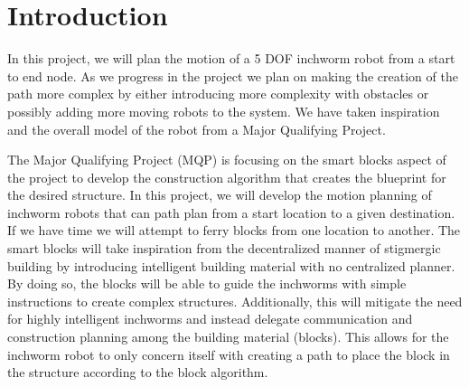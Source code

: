\section{Introduction}

In this project, we will plan the motion of a 5 DOF inchworm robot from a start to end node. As we progress in the project we plan on making the creation of the path more complex by either introducing more complexity with obstacles or possibly adding more moving robots to the system. We have taken inspiration and the overall model of the robot from a Major Qualifying Project. 

The Major Qualifying Project (MQP) is focusing on the smart blocks aspect of the project to develop the construction algorithm that creates the blueprint for the desired structure. In this project, we will develop the motion planning of inchworm robots that can path plan from a start location to a given destination. If we have time we will attempt to ferry blocks from one location to another. The smart blocks will take inspiration from the decentralized manner of stigmergic building by introducing intelligent building material with no centralized planner. By doing so, the blocks will be able to guide the inchworms with simple instructions to create complex structures. Additionally, this will mitigate the need for highly intelligent inchworms and instead delegate communication and construction planning among the building material (blocks). This allows for the inchworm robot to only concern itself with creating a path to place the block in the structure according to the block algorithm. 
